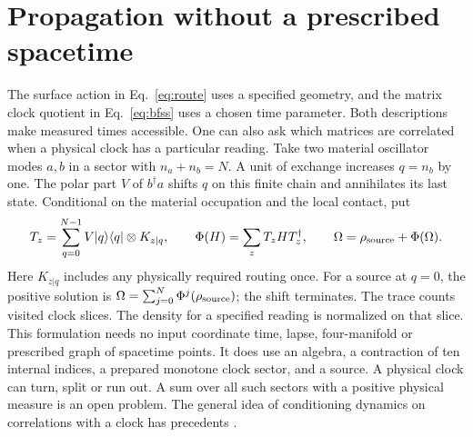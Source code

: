 \section{Propagation without a prescribed spacetime}\label{sec:geometry}
The surface action in Eq.~\eqref{eq:route} uses a specified geometry, and the matrix clock quotient in Eq.~\eqref{eq:bfss} uses a chosen time parameter. Both descriptions make measured times accessible. One can also ask which matrices are correlated when a physical clock has a particular reading. Take two material oscillator modes \(a,b\) in a sector with \(n_a+n_b=N\). A unit of exchange increases \(q=n_b\) by one. The polar part \(V\) of \(b^\dagger a\) shifts \(q\) on this finite chain and annihilates its last state. Conditional on the material occupation and the local contact, put
\begin{equation}
 T_z=\sum_{q=0}^{N-1}V|q\rangle\langle q|\otimes K_{z|q},\qquad
 \Phi(H)=\sum_z T_z H T_z^\dagger,\qquad
 \Omega=\rho_{\rm source}+\Phi(\Omega).
 \label{eq:clock}
\end{equation}
Here \(K_{z|q}\) includes any physically required routing once. For a source at \(q=0\), the positive solution is
\(\Omega=\sum_{j=0}^{N}\Phi^j(\rho_{\rm source})\); the shift terminates. The trace counts visited clock slices. The density for a specified reading is normalized on that slice. This formulation needs no input coordinate time, lapse, four-manifold or prescribed graph of spacetime points. It does use an algebra, a contraction of ten internal indices, a prepared monotone clock sector, and a source. A physical clock can turn, split or run out. A sum over all such sectors with a positive physical measure is an open problem. The general idea of conditioning dynamics on correlations with a clock has precedents \cite{pagewootters}.

